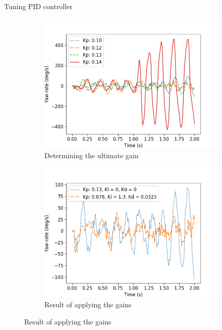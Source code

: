 \documentclass{beamer}
\begin{document}
\begin{frame}{Tuning PID controller}
	\begin{figure}
		\begin{center}
		\begin{subfigure}[b]{0.49\textwidth}
			\includegraphics[width=\textwidth]{pics/straight_ku.png}
			\caption*{Determining the ultimate gain}
		\end{subfigure}
		\begin{subfigure}[b]{0.49\textwidth}
			\includegraphics[width=\textwidth]{pics/straight_ku_with_tu.png}
			\caption*{Result of applying the gains}
		\end{subfigure}
		\end{center}
	\end{figure}
\end{frame}
\end{document}
